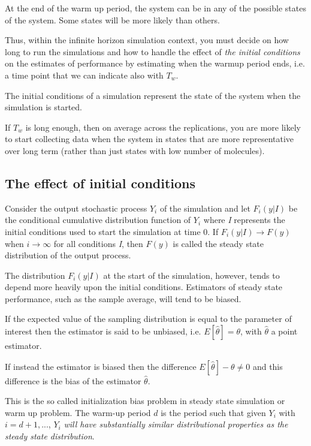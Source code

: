 \documentclass[12pt,a4paper]{report}
\begin{document}
At the end of the warm up period, the system can be in any of the possible states of the system. Some states will be more likely than others.

Thus, within the infinite horizon simulation context, you must decide on how long to run the simulations and how to handle the effect of \emph{the initial conditions} on the estimates of performance by estimating when the warmup period ends, i.e. a time point that we can indicate also with $T_{w}$.   

The initial conditions of a simulation represent the state of the system when the simulation is started.

If $T_{w}$ is long enough, then on average across the replications, you are more likely to start collecting data when the system in states that are more representative over long term (rather than just states with low number of molecules).



\subsection{The effect of initial conditions}
Consider the output stochastic process $Y_{i}$ of the simulation and let $F_{i}(y|I)$ be the conditional cumulative distribution function of $Y_{i}$ where \emph{I} represents the initial conditions used to start the simulation at time 0.  If $F_{i}(y|I) \rightarrow F(y)$ when $i \rightarrow \infty$ for all conditions \emph{I}, then $F(y)$ is called the steady state distribution of the output process.

The distribution $F_{i}(y|I)$ at the start of the simulation, however, tends to depend more heavily upon the initial conditions. Estimators of steady state performance, such as the sample average, will tend to be biased.

If the expected value of the sampling distribution is equal to the parameter of interest then the estimator is said to be unbiased, i.e. $E[\hat{\theta}] = \theta $, with $\hat{\theta}$ a point estimator.

If instead the estimator is biased then the difference $E[\hat{\theta}] - \theta \neq 0$ and this difference is the bias of the estimator $\hat{\theta}$.

This is the so called initialization bias problem in steady state simulation or warm up problem. The warm-up period $d$ is the period such that given $Y_{i}$ with $i=d+1,...$, $Y_{i}$ \emph{will have substantially similar distributional properties as the steady state distribution}.
\end{document}
